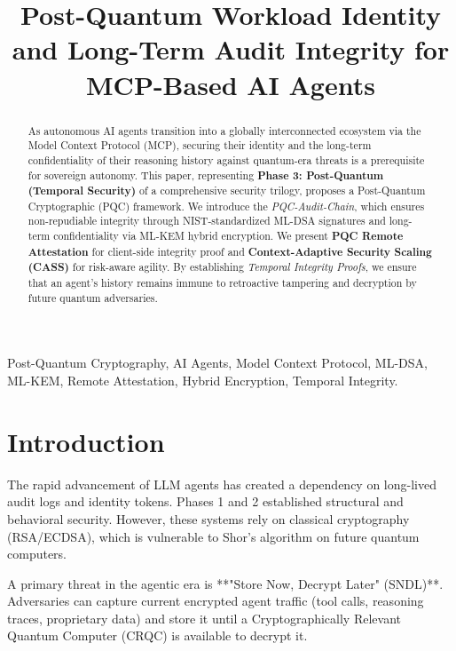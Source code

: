 \documentclass[conference]{IEEEtran}
\begin{document}
\title{Post-Quantum Workload Identity and Long-Term Audit Integrity for MCP-Based AI Agents}

\author{
}

\maketitle

\begin{abstract}
As autonomous AI agents transition into a globally interconnected ecosystem via the Model Context Protocol (MCP), securing their identity and the long-term confidentiality of their reasoning history against quantum-era threats is a prerequisite for sovereign autonomy. This paper, representing \textbf{Phase 3: Post-Quantum (Temporal Security)} of a comprehensive security trilogy, proposes a Post-Quantum Cryptographic (PQC) framework. We introduce the \textit{PQC-Audit-Chain}, which ensures non-repudiable integrity through NIST-standardized ML-DSA signatures and long-term confidentiality via ML-KEM hybrid encryption. We present \textbf{PQC Remote Attestation} for client-side integrity proof and \textbf{Context-Adaptive Security Scaling (CASS)} for risk-aware agility. By establishing \textit{Temporal Integrity Proofs}, we ensure that an agent's history remains immune to retroactive tampering and decryption by future quantum adversaries.
\end{abstract}

\begin{IEEEkeywords}
Post-Quantum Cryptography, AI Agents, Model Context Protocol, ML-DSA, ML-KEM, Remote Attestation, Hybrid Encryption, Temporal Integrity.
\end{IEEEkeywords}

\section{Introduction}
The rapid advancement of LLM agents has created a dependency on long-lived audit logs and identity tokens. Phases 1 and 2 \cite{ando2026guardrails, ando2026zerotrust} established structural and behavioral security. However, these systems rely on classical cryptography (RSA/ECDSA), which is vulnerable to Shor's algorithm on future quantum computers.

A primary threat in the agentic era is **"Store Now, Decrypt Later" (SNDL)**. Adversaries can capture current encrypted agent traffic (tool calls, reasoning traces, proprietary data) and store it until a Cryptographically Relevant Quantum Computer (CRQC) is available to decrypt it.
\end{document}
